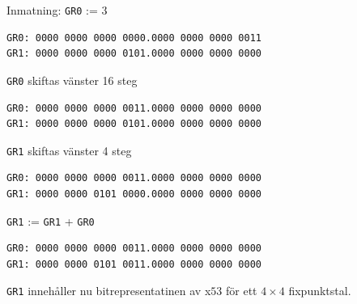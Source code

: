 \documentclass[]{article}
\begin{document}
\begin{appendices}
\newpage

Inmatning: \texttt{GR0} := 3
\begin{framed}
\begin{verbatim}
GR0: 0000 0000 0000 0000.0000 0000 0000 0011
GR1: 0000 0000 0000 0101.0000 0000 0000 0000
\end{verbatim}
\end{framed}

\texttt{GR0} skiftas vänster 16 steg
\begin{framed}
\begin{verbatim}
GR0: 0000 0000 0000 0011.0000 0000 0000 0000
GR1: 0000 0000 0000 0101.0000 0000 0000 0000
\end{verbatim}
\end{framed}

\texttt{GR1} skiftas vänster 4 steg
\begin{framed}
\begin{verbatim}
GR0: 0000 0000 0000 0011.0000 0000 0000 0000
GR1: 0000 0000 0101 0000.0000 0000 0000 0000
\end{verbatim}
\end{framed}

\texttt{GR1} := \texttt{GR1} + \texttt{GR0}
\begin{framed}
\begin{verbatim}
GR0: 0000 0000 0000 0011.0000 0000 0000 0000
GR1: 0000 0000 0101 0011.0000 0000 0000 0000
\end{verbatim}
\end{framed}

\texttt{GR1} innehåller nu bitrepresentatinen av x$53$ för ett $4 \times 4$ fixpunktstal.
\end{appendices}
\end{document}
